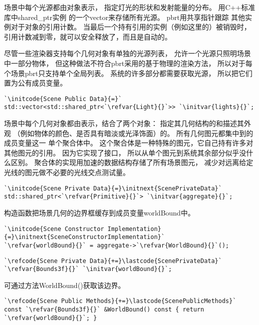 场景中每个光源都由对象表示，
指定灯光的形状和发射能量的分布。
用C++标准库中{\ttfamily shared\_ptr}实例
的一个{\ttfamily vector}来存储所有光源。
pbrt用共享指针跟踪
其他实例对于对象的引用计数。
当最后一个持有引用的实例（例如这里的）被销毁时，
引用计数减到零，就可以安全释放了，而且是自动的。

尽管一些渲染器支持每个几何对象有单独的光源列表，
允许一个光源只照明场景中一部分物体，
但这种做法不符合pbrt采用的基于物理的渲染方法，
所以对于每个场景pbrt只支持单个全局列表。
系统的许多部分都需要获取光源，
所以把它们置为公有成员变量。
\begin{lstlisting}
`\initcode{Scene Public Data}{=}`
std::vector<std::shared_ptr<`\refvar{Light}{}`>> `\initvar{lights}{}`;
\end{lstlisting}

场景中每个几何对象都由表示，结合了两个对象：
指定其几何结构的和描述其外观
（例如物体的颜色、是否具有暗淡或光泽饰面）的。
所有几何图元都集中到的
成员变量这一
单个聚合体中。
这个聚合体是一种特殊的图元，它自己持有许多对其他图元的引用。
因为它实现了接口，
所以从单个图元到系统其余部分似乎没什么区别。
聚合体的实现用加速的数据结构存储了所有场景图元，
减少对远离给定光线的图元做不必要的光线交点测试量。
\begin{lstlisting}
`\initcode{Scene Private Data}{=}\initnext{ScenePrivateData}`
std::shared_ptr<`\refvar{Primitive}{}`> `\initvar{aggregate}{}`;
\end{lstlisting}
构造函数把场景几何的边界框缓存到成员变量{\ttfamily worldBound}中。
\begin{lstlisting}
`\initcode{Scene Constructor Implementation}{=}\initnext{SceneConstructorImplementation}`
`\refvar{worldBound}{}` = aggregate->`\refvar{WorldBound}{}`();
\end{lstlisting}
\begin{lstlisting}
`\refcode{Scene Private Data}{+=}\lastcode{ScenePrivateData}`
`\refvar{Bounds3f}{}` `\initvar{worldBound}{}`;
\end{lstlisting}
可通过方法{\ttfamily WorldBound()}获取该边界。
\begin{lstlisting}
`\refcode{Scene Public Methods}{+=}\lastcode{ScenePublicMethods}`
const `\refvar{Bounds3f}{}` &WorldBound() const { return `\refvar{worldBound}{}`; }
\end{lstlisting}

